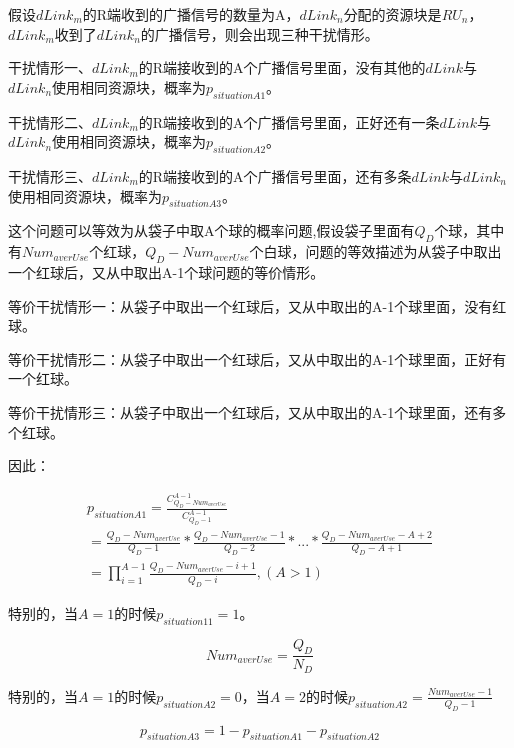 \documentclass[figurelist,tablelist,algorithmlist,nomlist,masters]{seuthesix}
\begin{document}
	假设$dLink_m$的R端收到的广播信号的数量为A，$dLink_n$分配的资源块是$RU_n$，$dLink_m$收到了$dLink_n$的广播信号，则会出现三种干扰情形。
	
	干扰情形一、$dLink_m$的R端接收到的A个广播信号里面，没有其他的$dLink$与$dLink_n$使用相同资源块，概率为${p_{situationA1}}$。
	
	干扰情形二、$dLink_m$的R端接收到的A个广播信号里面，正好还有一条$dLink$与$dLink_n$使用相同资源块，概率为${p_{situationA2}}$。
	
	干扰情形三、$dLink_m$的R端接收到的A个广播信号里面，还有多条$dLink$与$dLink_n$使用相同资源块，概率为${p_{situationA3}}$。
	
	这个问题可以等效为从袋子中取A个球的概率问题,假设袋子里面有$Q_D$个球，其中有$Nu{m_{averUse}}$个红球，$Q_D - Nu{m_{averUse}}$个白球，问题的等效描述为从袋子中取出一个红球后，又从中取出A-1个球问题的等价情形。
	
	等价干扰情形一：从袋子中取出一个红球后，又从中取出的A-1个球里面，没有红球。
	
	等价干扰情形二：从袋子中取出一个红球后，又从中取出的A-1个球里面，正好有一个红球。
	
	等价干扰情形三：从袋子中取出一个红球后，又从中取出的A-1个球里面，还有多个红球。
	
	因此：
	
	\begin{equation}\label{eq3.1}
	\begin{array}{c}
	{p_{situationA1}} = \frac{{C_{Q_D - Nu{m_{averUse}}}^{A - 1}}}{{C_{Q_D - 1}^{A - 1}}}\\
	= \frac{{Q_D - Nu{m_{averUse}}}}{{Q_D - 1}}*\frac{{Q_D - Nu{m_{averUse}} - 1}}{{Q_D - 2}}*...*\frac{{Q_D - Nu{m_{averUse}} - A + 2}}{{Q_D - A + 1}}\\
	= \prod\limits_{i = 1}^{A - 1} {\frac{{Q_D - Nu{m_{averUse}} - i + {1}}}{{Q_D - i}},(A > 1)} 
	\end{array}
	\end{equation}
	
	特别的，当${A = 1}$的时候${p_{situation11} = 1}$。
	
	\begin{equation}\label{eq3.1}
	Nu{m_{averUse}} = \frac{{Q_D}}{{N_D}}
	\end{equation}
	
	特别的，当${A=1}$的时候${p_{situationA2}} = 0$，当$A=2$的时候${p_{situationA2}} = \frac{{Nu{m_{averUse}} - 1}}{{Q_D - 1}}$
	
	\begin{equation}\label{eq3.1}
	{p_{situationA3}} = 1 - {p_{situationA1}} - {p_{situationA{2}}}
	\end{equation}
	
\end{document}
